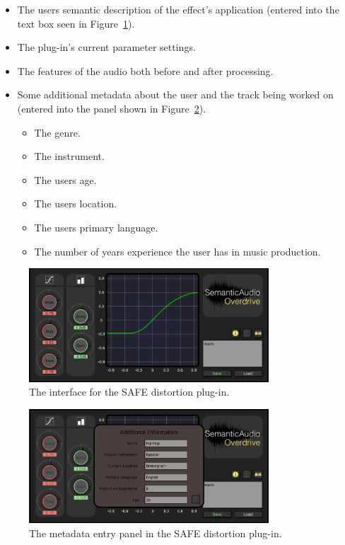 		\begin{itemize}
			\item The users semantic description of the effect's application (entered into the text box seen in
				Figure~\ref{fig:SAFE-Distortion}).
			\item The plug-in's current parameter settings.
			\item The features of the audio both before and after processing.
			\item Some additional metadata about the user and the track being worked on (entered into the panel
				shown in Figure~\ref{fig:SAFE-Metadata}).
			\begin{itemize}
				\item The genre.
				\item The instrument.
				\item The users age.
				\item The users location.
				\item The users primary language.
				\item The number of years experience the user has in music production.
			\end{itemize}
		\end{itemize}

		\begin{figure}[h!]
			\centering
			\includegraphics[width=0.8\textwidth]{chapter4/Images/SAFEDistortion.png}
			\caption{The interface for the SAFE distortion plug-in.}
			\label{fig:SAFE-Distortion}
		\end{figure}

		\begin{figure}[h!]
			\centering
			\includegraphics[width=0.8\textwidth]{chapter4/Images/SAFEMetadata.png}
			\caption{The metadata entry panel in the SAFE distortion plug-in.}
			\label{fig:SAFE-Metadata}
		\end{figure}

